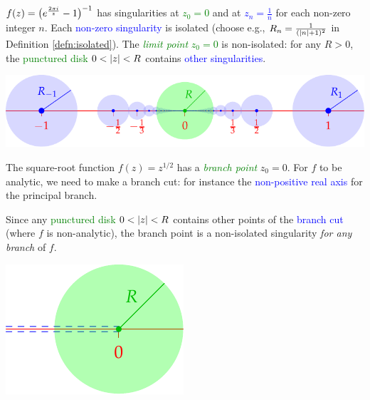 \begin{examples}{}{}
	\exstart $f(z)=\bigl(e^{\frac{2\pi i}{z}}-1\bigr)^{-1}$ has singularities at \textcolor{Green}{$z_0=0$} and at \textcolor{blue}{$z_n=\frac 1n$} for each non-zero integer $n$. Each \textcolor{blue}{non-zero singularity} is isolated (choose e.g., \textcolor{blue}{$R_n=\frac 1{(\left| n\right|+1)^2}$} in Definition \ref{defn:isolated}). The \textcolor{Green}{\emph{limit point} $z_0=0$} is non-isolated: for any $R>0$, the \textcolor{Green}{punctured disk} $0<\left| z\right|<R$ contains \textcolor{blue}{other singularities}.
	\begin{center}
		\includegraphics[scale=0.95]{sing1}
	\end{center}
	
	\begin{enumerate}\setcounter{enumi}{1}
		\begin{minipage}[t]{0.72\linewidth}\vspace{0pt}
		  \item The square-root function $f(z)=z^{1/2}$ has a \textcolor{Green}{\emph{branch point}} $z_0=0$. For $f$ to be analytic, we need to make a branch cut: for instance the \textcolor{blue}{non-positive real axis} for the principal branch.\par
		  Since any \textcolor{Green}{punctured disk} $0<\left| z\right|<R$ contains other points of the \textcolor{blue}{branch cut} (where $f$ is non-analytic), the branch point is a non-isolated singularity \emph{for any branch} of $f$.\par
		\end{minipage}
		\hfill
		\begin{minipage}[t]{0.25\linewidth}\vspace{0pt}
			\flushright\includegraphics[scale=0.95]{sing2}
		\end{minipage}
	\end{enumerate}
\end{examples}


